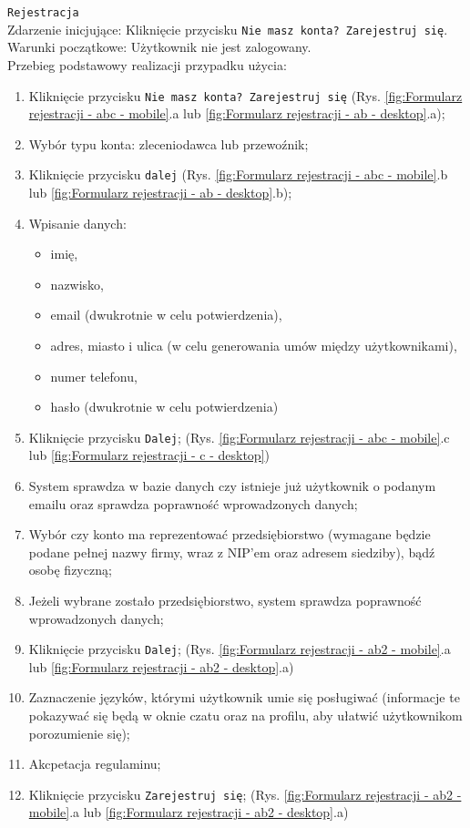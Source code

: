 \texttt{Rejestracja} \\
Zdarzenie inicjujące: Kliknięcie przycisku \texttt{Nie masz konta? Zarejestruj się}. \\
Warunki początkowe: Użytkownik nie jest zalogowany. \\
Przebieg podstawowy realizacji przypadku użycia:
\begin{enumerate}
    \item Kliknięcie przycisku \texttt{Nie masz konta? Zarejestruj się} (Rys. \ref{fig:Formularz rejestracji - abc - mobile}.a lub \ref{fig:Formularz rejestracji - ab - desktop}.a);
    \item Wybór typu konta: zleceniodawca lub przewoźnik;
    \item Kliknięcie przycisku \texttt{dalej} (Rys. \ref{fig:Formularz rejestracji - abc - mobile}.b lub \ref{fig:Formularz rejestracji - ab - desktop}.b);
    \item Wpisanie danych:
        \begin{itemize}
            \item imię,
            \item nazwisko,
            \item email (dwukrotnie w celu potwierdzenia),
            \item adres, miasto i ulica (w celu generowania umów między użytkownikami),
            \item numer telefonu,
            \item hasło (dwukrotnie w celu potwierdzenia)
        \end{itemize}
    \item Kliknięcie przycisku \texttt{Dalej}; (Rys. \ref{fig:Formularz rejestracji - abc - mobile}.c lub \ref{fig:Formularz rejestracji - c - desktop})
    \item System sprawdza w bazie danych czy istnieje już użytkownik o podanym emailu oraz sprawdza poprawność wprowadzonych danych;
    \item Wybór czy konto ma reprezentować przedsiębiorstwo (wymagane będzie podane pełnej nazwy firmy, wraz z NIP'em oraz adresem siedziby), bądź osobę fizyczną;
    \item Jeżeli wybrane zostało przedsiębiorstwo, system sprawdza poprawność wprowadzonych danych;
    \item Kliknięcie przycisku \texttt{Dalej}; (Rys. \ref{fig:Formularz rejestracji - ab2 - mobile}.a lub \ref{fig:Formularz rejestracji - ab2 - desktop}.a)
    \item Zaznaczenie języków, którymi użytkownik umie się posługiwać (informacje te pokazywać się będą w oknie czatu oraz na profilu, aby ułatwić użytkownikom porozumienie się);
    \item Akcpetacja regulaminu;
    \item Kliknięcie przycisku \texttt{Zarejestruj się}; (Rys. \ref{fig:Formularz rejestracji - ab2 - mobile}.a lub \ref{fig:Formularz rejestracji - ab2 - desktop}.a)
\end{enumerate}
